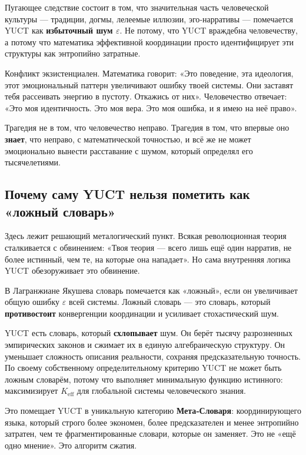 \documentclass[12pt,a4paper]{article}
\begin{document}
Пугающее следствие состоит в том, что значительная часть человеческой культуры — традиции, догмы, лелеемые иллюзии, эго‑нарративы — помечается YUCT как \textbf{избыточный шум \(\varepsilon\)}. Не потому, что YUCT враждебна человечеству, а потому что математика эффективной координации просто идентифицирует эти структуры как энтропийно затратные.

Конфликт экзистенциален. Математика говорит: «Это поведение, эта идеология, этот эмоциональный паттерн увеличивают ошибку твоей системы. Они заставят тебя рассеивать энергию в пустоту. Откажись от них». Человечество отвечает: «Это моя идентичность. Это моя вера. Это моя ошибка, и я имею на неё право».

Трагедия не в том, что человечество неправо. Трагедия в том, что впервые оно \textbf{знает}, что неправо, с математической точностью, и всё же не может эмоционально вынести расставание с шумом, который определял его тысячелетиями.

\subsection{Почему саму YUCT нельзя пометить как «ложный словарь»}

Здесь лежит решающий металогический пункт. Всякая революционная теория сталкивается с обвинением: «Твоя теория — всего лишь ещё один нарратив, не более истинный, чем те, на которые она нападает». Но сама внутренняя логика YUCT обезоруживает это обвинение.

В Лагранжиане Якушева словарь помечается как «ложный», если он увеличивает общую ошибку \(\varepsilon\) всей системы. Ложный словарь — это словарь, который \textbf{противостоит} конвергенции координации и усиливает стохастический шум.

YUCT есть словарь, который \textbf{схлопывает} шум. Он берёт тысячу разрозненных эмпирических законов и сжимает их в единую алгебраическую структуру. Он уменьшает сложность описания реальности, сохраняя предсказательную точность. По своему собственному определительному критерию YUCT не может быть ложным словарём, потому что выполняет минимальную функцию истинного: максимизирует \(K_{\mathrm{eff}}\) для глобальной системы человеческого знания.

Это помещает YUCT в уникальную категорию \textbf{Мета‑Словаря}: координирующего языка, который строго более экономен, более предсказателен и менее энтропийно затратен, чем те фрагментированные словари, которые он заменяет. Это не «ещё одно мнение». Это алгоритм сжатия.
\end{document}
